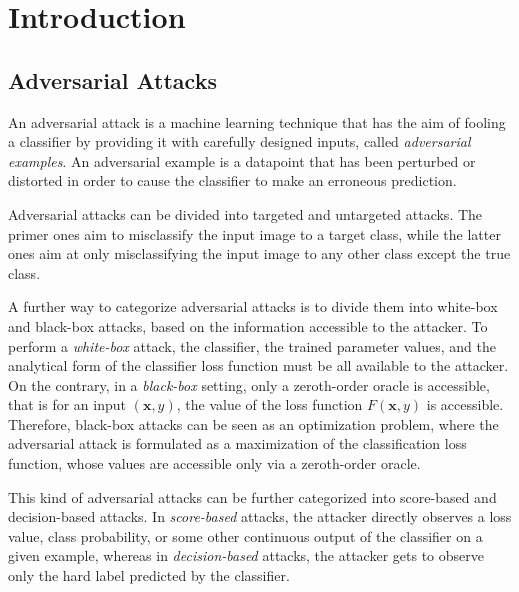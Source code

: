 \section{Introduction}

\subsection{Adversarial Attacks}
An adversarial attack is a machine learning technique that has the aim of fooling a classifier by providing it with
carefully designed inputs, called \textit{adversarial examples}. An adversarial example is a datapoint that has
been perturbed or distorted in order to cause the classifier to make an erroneous prediction.

Adversarial attacks can be divided into targeted and untargeted attacks. The primer ones aim to
misclassify the input image to a target class, while the latter ones aim at only misclassifying
the input image to any other class except the true class.

A further way to categorize adversarial attacks is to divide them into white-box and black-box attacks, based on
the information accessible to the attacker. To perform a \textit{white-box} attack, the classifier, the trained
parameter values, and the analytical form of the classifier loss function must be all available to the attacker. On
the contrary, in a \textit{black-box} setting, only a zeroth-order oracle is accessible, that is for an input $(\mathbf{x},y)$,
the value of the loss function $F(\mathbf{x},y)$ is accessible. Therefore, black-box attacks can be seen as an optimization problem,
where the adversarial attack is formulated as a maximization of the classification loss function, whose values are
accessible only via a zeroth-order oracle.

This kind of adversarial attacks can be further categorized into score-based and decision-based attacks.
In \textit{score-based} attacks, the attacker directly observes a loss value, class probability, or some other
continuous output of the classifier on a given example, whereas in \textit{decision-based} attacks, the attacker gets to
observe only the hard label predicted by the classifier.




